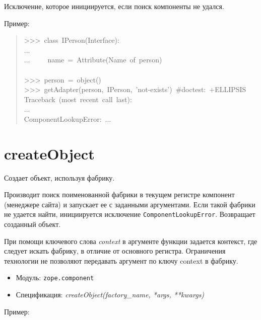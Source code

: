 \documentclass[14pt,a4paper,openany,twoside,final]{extbook}
\providecommand*{\DUroletitlereference}[1]{\textsl{#1}}
\begin{document}
Исключение, которое инициируется, если поиск компоненты не удался.

Пример:

\begin{quote}{\ttfamily \raggedright \noindent
>{}>{}>~class~IPerson(Interface):\\
...\\
...~~~~~name~=~Attribute(\textquotedbl{}Name~of~person\textquotedbl{})\\
~\\
>{}>{}>~person~=~object()\\
>{}>{}>~getAdapter(person,~IPerson,~'not-exists')~\#doctest:~+ELLIPSIS\\
Traceback~(most~recent~call~last):\\
...\\
ComponentLookupError:~...
}
\end{quote}


\section*{createObject%
  \label{createobject}%
}

Создает объект, используя фабрику.

Производит поиск поименованной фабрики в текущем регистре
компонент (менеджере сайта) и запускает ее с заданными аргументами.
Если такой фабрики не удается найти, инициируется исключение
\texttt{ComponentLookupError}.  Возвращает созданный объект.

При помощи ключевого слова \DUroletitlereference{context} в аргументе функции задается
контекст, где следует искать фабрику, в отличие от основного регистра.
Ограничения технологии не позволяют передавать аргумент по ключу
\textquotedbl{}context\textquotedbl{} в фабрику.

\begin{itemize}

\item Модуль: \texttt{zope.component}

\item Спецификация: \DUroletitlereference{createObject(factory\_name, *args, **kwargs)}

\end{itemize}

Пример:
\end{document}
